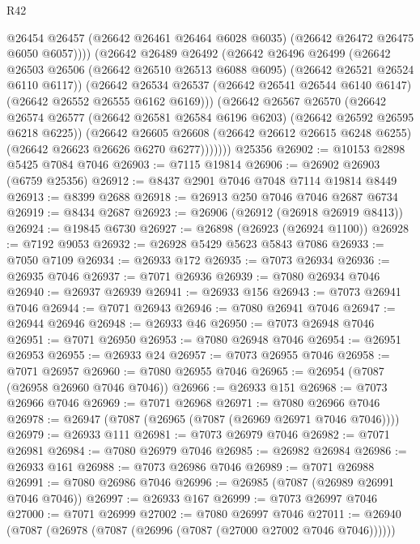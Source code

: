 \begin{lexlean}{R42}
\begin{coremodule}
{                @26454
                @26457
                (@26642 @26461 @26464 @6028 @6035)
                (@26642 @26472 @26475 @6050 @6057))))
          (@26642
            @26489
            @26492
            (@26642
              @26496
              @26499
              (@26642
                @26503
                @26506
                (@26642 @26510 @26513 @6088 @6095)
                (@26642 @26521 @26524 @6110 @6117))
              (@26642
                @26534
                @26537
                (@26642 @26541 @26544 @6140 @6147)
                (@26642 @26552 @26555 @6162 @6169)))
            (@26642
              @26567
              @26570
              (@26642
                @26574
                @26577
                (@26642 @26581 @26584 @6196 @6203)
                (@26642 @26592 @26595 @6218 @6225))
              (@26642
                @26605
                @26608
                (@26642 @26612 @26615 @6248 @6255)
                (@26642 @26623 @26626 @6270 @6277)))))))
    @25356
@26902 := @10153 @2898 @5425 @7084 @7046
@26903 := @7115 @19814
@26906 := @26902 @26903 (@6759 @25356)
@26912 := @8437 @2901 @7046 @7048 @7114 @19814 @8449
@26913 := @8399 @2688
@26918 := @26913 @250 @7046 @7046 @2687 @6734
@26919 := @8434 @2687
@26923 := @26906 (@26912 (@26918 @26919 @8413))
@26924 := @19845 @6730
@26927 := @26898 (@26923 (@26924 @1100))
@26928 := @7192 @9053
@26932 := @26928 @5429 @5623 @5843 @7086
@26933 := @7050 @7109
@26934 := @26933 @172
@26935 := @7073 @26934
@26936 := @26935 @7046
@26937 := @7071 @26936
@26939 := @7080 @26934 @7046
@26940 := @26937 @26939
@26941 := @26933 @156
@26943 := @7073 @26941 @7046
@26944 := @7071 @26943
@26946 := @7080 @26941 @7046
@26947 := @26944 @26946
@26948 := @26933 @46
@26950 := @7073 @26948 @7046
@26951 := @7071 @26950
@26953 := @7080 @26948 @7046
@26954 := @26951 @26953
@26955 := @26933 @24
@26957 := @7073 @26955 @7046
@26958 := @7071 @26957
@26960 := @7080 @26955 @7046
@26965 := @26954 (@7087 (@26958 @26960 @7046 @7046))
@26966 := @26933 @151
@26968 := @7073 @26966 @7046
@26969 := @7071 @26968
@26971 := @7080 @26966 @7046
@26978 := @26947 (@7087 (@26965 (@7087 (@26969 @26971 @7046 @7046))))
@26979 := @26933 @111
@26981 := @7073 @26979 @7046
@26982 := @7071 @26981
@26984 := @7080 @26979 @7046
@26985 := @26982 @26984
@26986 := @26933 @161
@26988 := @7073 @26986 @7046
@26989 := @7071 @26988
@26991 := @7080 @26986 @7046
@26996 := @26985 (@7087 (@26989 @26991 @7046 @7046))
@26997 := @26933 @167
@26999 := @7073 @26997 @7046
@27000 := @7071 @26999
@27002 := @7080 @26997 @7046
@27011 := @26940 (@7087 (@26978 (@7087 (@26996 (@7087 (@27000 @27002 @7046 @7046))))))
}
\end{coremodule}
\end{lexlean}
